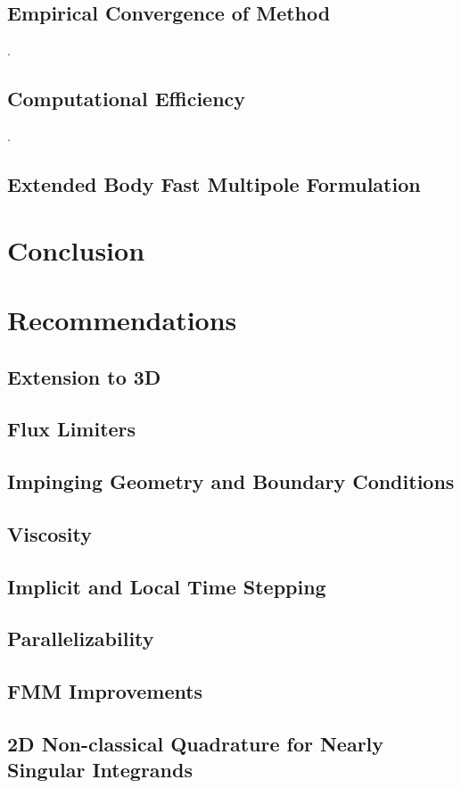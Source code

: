 \documentclass[letterpaper,12pt]{report}
\begin{document}
\section{Empirical Convergence of Method}
\newpage.
\newpage
\section{Computational Efficiency}
\newpage.
\newpage
\section{Extended Body Fast Multipole Formulation}
\chapter{Conclusion}
\chapter{Recommendations}
\section{Extension to 3D}
\section{Flux Limiters}
\section{Impinging Geometry and Boundary Conditions}
\section{Viscosity}
\newpage
\section{Implicit and Local Time Stepping}
\section{Parallelizability}
\section{FMM Improvements}
\section{2D Non-classical Quadrature for Nearly Singular Integrands}
\end{document}
